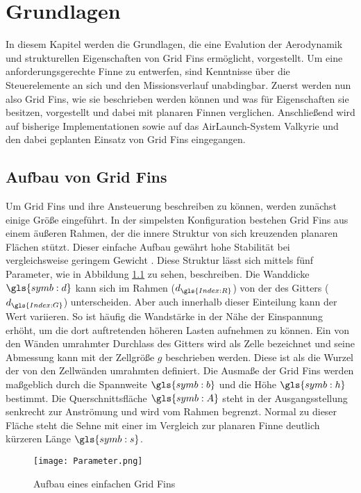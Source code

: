 \chapter{Grundlagen}
\label{sec:grundlagen}
In diesem Kapitel werden die Grundlagen, die eine Evalution der Aerodynamik und strukturellen Eigenschaften von Grid Fins ermöglicht, vorgestellt. Um eine anforderungsgerechte Finne zu entwerfen, sind Kenntnisse über die Steuerelemente an sich und den Missionsverlauf unabdingbar.
Zuerst werden nun also Grid Fins, wie sie beschrieben werden können und was für Eigenschaften sie besitzen, vorgestellt und dabei mit planaren Finnen verglichen. Anschließend wird auf bisherige Implementationen sowie auf das AirLaunch-System Valkyrie und den dabei geplanten Einsatz von Grid Fins eingegangen.
\section{Aufbau von Grid Fins}
Um Grid Fins und ihre Ansteuerung beschreiben zu können, werden zunächst einige Größe eingeführt.
In der simpelsten Konfiguration bestehen Grid Fins aus einem äußeren Rahmen, der die innere Struktur von sich kreuzenden planaren Flächen stützt. Dieser einfache Aufbau gewährt hohe Stabilität bei vergleichsweise geringem Gewicht \cite{zellform}.
Diese Struktur lässt sich mittels fünf Parameter, wie in Abbildung \ref{abb_parameter} zu sehen, beschreiben. Die Wanddicke $\gls{symb:d}$ kann sich im Rahmen ($d_{\gls{Index:R}}$) von der des Gitters ($d_{\gls{Index:G}}$) unterscheiden. Aber auch innerhalb dieser Einteilung kann der Wert variieren. So ist häufig die Wandstärke in der Nähe der Einspannung erhöht, um die dort auftretenden höheren Lasten aufnehmen zu können. Ein von den Wänden umrahmter Durchlass des Gitters wird als Zelle bezeichnet und seine Abmessung kann mit der Zellgröße $g$ beschrieben werden. Diese ist als die Wurzel der von den Zellwänden umrahmten definiert. Die Ausmaße der Grid Fins werden maßgeblich durch die Spannweite $\gls{symb:b}$ und die Höhe $\gls{symb:h}$ bestimmt. Die Querschnittsfläche $\gls{symb:A}$ steht in der Ausgangsstellung senkrecht zur Anströmung und wird vom Rahmen begrenzt. Normal zu dieser Fläche steht die Sehne mit einer im Vergleich zur planaren Finne deutlich kürzeren Länge $\gls{symb:s}$.\\
\begin{figure}[h]
	\centering
	\texttt{[image: Parameter.png]}
	\caption{Aufbau eines einfachen Grid Fins}
	\label{abb_parameter}
\end{figure}\\
